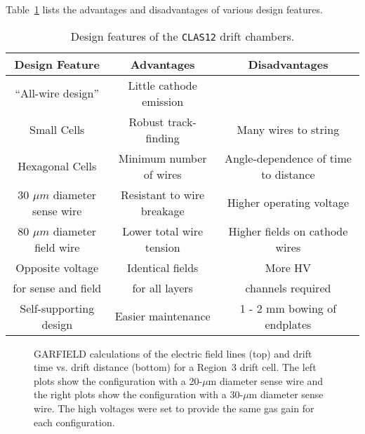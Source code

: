 Table~\ref{fwd-dc-design-features} lists the advantages and disadvantages
of various design features.
\begin{table}[ht]
\begin{center}
\begin{tabular} {||c|c|c||} \hline \hline
{\bf Design Feature  }       &{\bf Advantages} &{\bf Disadvantages}\\ \hline
``All-wire design'' & Little cathode emission & \\ \hline
Small Cells & Robust track-finding  & Many wires to string \\ \hline
Hexagonal Cells & Minimum number of wires  & Angle-dependence of time to distance  \\ \hline
30 $\mu m$ diameter sense wire & Resistant to wire breakage & Higher operating voltage \\ \hline
80 $\mu m$ diameter field wire & Lower total wire tension & Higher fields on cathode wires \\ \hline
Opposite voltage  & Identical fields & More HV \\
for sense and field & for all layers & channels required \\ \hline
Self-supporting design & Easier maintenance & 1 - 2 mm bowing of endplates \\ \hline
\end{tabular}
\caption{\small{Design features of the {\tt CLAS12} drift chambers.}}
\label{fwd-dc-design-features}
\end{center}
\end{table}

\begin{figure}[htbp]
\vspace{14.0cm}
\caption{\small{GARFIELD calculations of the electric field lines (top)
and drift time vs. drift distance (bottom) for a Region~3 drift cell.  The 
left plots show the configuration with a 20-$\mu$m diameter sense wire and 
the right plots show the configuration with a 30-$\mu$m diameter sense wire.
The high voltages were set to provide the same gas gain for each
configuration.}}
\label{garfield-20-vs-30-micron}
\end{figure}


